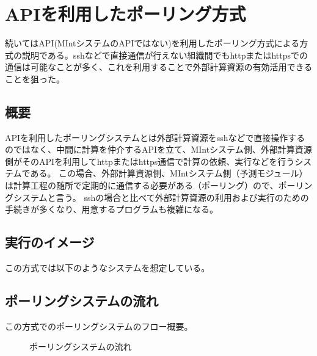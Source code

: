 \documentclass[letterpaper,10pt,dvipdfmx,openany]{sphinxmanual}
\begin{document}
\newpage


\section{APIを利用したポーリング方式}
\label{\detokenize{using_distributed_properties:api}}
続いてはAPI(MIntシステムのAPIではない)を利用したポーリング方式による方式の説明である。sshなどで直接通信が行えない組織間でもhttpまたはhttpsでの通信は可能なことが多く、これを利用することで外部計算資源の有効活用できることを狙った。


\subsection{概要}
\label{\detokenize{using_distributed_properties:id15}}
APIを利用したポーリングシステムとは外部計算資源をsshなどで直接操作するのではなく、中間に計算を仲介するAPIを立て、MIntシステム側、外部計算資源側がそのAPIを利用してhttpまたはhttps通信で計算の依頼、実行などを行うシステムである。
この場合、外部計算資源側、MIntシステム側（予測モジュール）は計算工程の随所で定期的に通信する必要がある（ポーリング）ので、ポーリングシステムと言う。
sshの場合と比べて外部計算資源の利用および実行のための手続きが多くなり、用意するプログラムも複雑になる。

\newpage


\subsection{実行のイメージ}
\label{\detokenize{using_distributed_properties:id16}}
この方式では以下のようなシステムを想定している。

\begin{figure}[htbp]
\centering

\noindent{}
\end{figure}



\newpage


\subsection{ポーリングシステムの流れ}
\label{\detokenize{using_distributed_properties:id17}}
この方式でのポーリングシステムのフロー概要。

\begin{figure}[htbp]
\centering
\capstart

\caption{ポーリングシステムの流れ}\label{\detokenize{using_distributed_properties:id46}}\end{figure}
\end{document}
